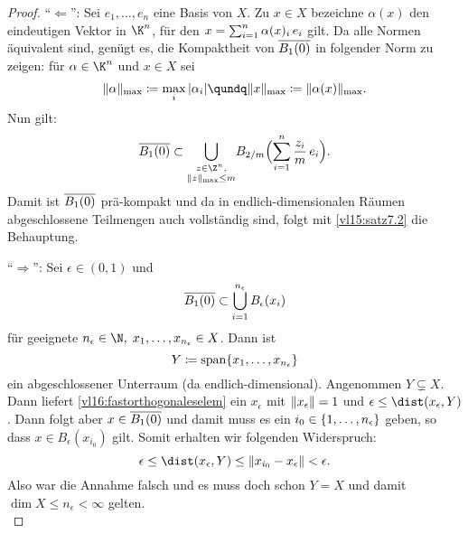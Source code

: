 \begin{proof}
    \enquote{$\Leftarrow$}: Sei $e_1,\dots,e_n$ eine Basis von $X$. 
    Zu $x\in X$ bezeichne $\alpha(x)$ den eindeutigen Vektor in $\K^n$,
    für den $x = \sum_{i=1}^n \alpha(x)_i\,e_i$ gilt.
    Da alle Normen äquivalent sind, genügt es, die Kompaktheit von 
    $\overline{B_1(0)}$ in folgender Norm zu zeigen: für $\alpha\in\K^n$ 
    und $x\in X$ sei
    \[ \norm{\alpha}_\mr{max} \defeq \max_i \, \abs{\alpha_i} \qundq
    \norm{x}_\mr{max} \defeq \norm{\alpha(x)}_\mr{max}  . \]
    Nun gilt:
    \[
        \setclosure{B_1(0)} \subset
        \bigcup_{\substack{z\in\Z^n,\\\norm{z}_\mr{max}\leq m}}
        \mkern-3mu B_{2/m}\Bigl( \isum^n \frac{z_i}{m}\, e_i \Bigr)
    . \]
    Damit ist $\overline{B_1(0)}$ prä-kompakt und da in endlich-dimensionalen
    Räumen abgeschlossene Teilmengen auch vollständig sind, folgt mit
    \cref{vl15:satz7.2} die Behauptung.
    
    \enquote{$\Rightarrow$}: Sei $\epsilon\in(0,1)$ und
    \[ \overline{B_1(0)} \subset \bigcup_{i=1}^{n_\epsilon} B_\epsilon(x_i)
    \]
    für geeignete $n_\epsilon\in\N,\;x_1,\ldots,x_{n_\epsilon}\in X$. Dann ist
    \[ Y \coloneqq \operatorname{span}\{x_1,\dots,x_{n_\epsilon}\} \]
    ein abgeschlossener Unterraum (da endlich-dimensional). Angenommen
    $Y\subsetneq X$. Dann liefert \cref{vl16:fastorthogonaleselem}
    ein $x_\epsilon$ mit $\lVert x_\epsilon\rVert=1$ und $\epsilon \leq
    \dist(x_\epsilon, Y)$. Dann folgt aber $x\in \overline{B_1(0)}$
    und damit muss es ein $i_0\in\{1,\ldots,n_\epsilon\}$ geben, so dass
    $x\in B_\epsilon(x_{i_0})$ gilt. Somit erhalten wir folgenden Widerspruch:
    \[ \epsilon \leq \dist(x_\epsilon, Y) 
        \leq \norm{x_{i_0}-x_\epsilon}
        < \epsilon
    . \]
    Also war die Annahme falsch und es muss doch schon $Y=X$ und damit 
    $\dim X \leq n_\epsilon < \infty$ gelten.
    \\
\end{proof}

